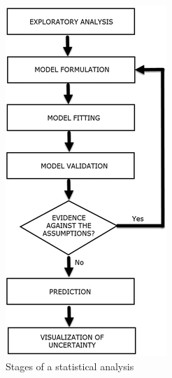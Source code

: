 \documentclass[
  letterpaper,
]{krantz}
\begin{document}
\begin{figure}

{\centering \includegraphics{./figures/workflow_diagram.png}

}

\caption{\label{fig-stages}Stages of a statistical analysis}

\end{figure}
\end{document}
